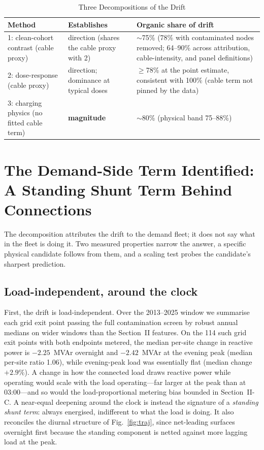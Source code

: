 \documentclass[journal]{IEEEtran}
\begin{document}
\begin{table}[!t]
\caption{Three Decompositions of the Drift}
\label{tab:triangulation}
\centering
\renewcommand{\arraystretch}{1.18}
\begin{tabular}{@{}p{}p{}p{}@{}}
\toprule
\textbf{Method} & \textbf{Establishes} & \textbf{Organic share of drift} \\
\midrule
1: clean-cohort contrast (cable proxy) & direction (shares the cable proxy with 2) & $\sim$75\% (78\% with contaminated nodes removed; 64--90\% across attribution, cable-intensity, and panel definitions) \\
2: dose-response (cable proxy) & direction; dominance at typical doses & $\geq$78\% at the point estimate, consistent with 100\% (cable term not pinned by the data) \\
3: charging physics (no fitted cable term) & \textbf{magnitude} & $\sim$80\% (physical band 75--88\%) \\
\bottomrule
\end{tabular}
\end{table}

\section{The Demand-Side Term Identified: A Standing Shunt Term Behind
Connections}
The decomposition attributes the drift to the demand fleet; it does not say what
in the fleet is doing it. Two measured properties narrow the answer, a specific
physical candidate follows from them, and a scaling test probes the candidate's
sharpest prediction.

\subsection{Load-independent, around the clock}
First, the drift is load-independent. Over the 2013--2025 window we summarise
each grid exit point passing the full contamination screen by robust annual
medians on wider windows than the Section~II features. On the 114 such grid exit
points with both endpoints metered, the median per-site change in reactive power
is $-2.25$~MVAr overnight and $-2.42$~MVAr at the evening peak (median per-site
ratio 1.06), while evening-peak load was essentially flat (median change
$+2.9\%$). A change in how the connected load draws reactive power while
operating would scale with the load operating---far larger at the peak than at
03:00---and so would the load-proportional metering bias bounded in
Section~II-C. A near-equal deepening around the clock is instead the signature of a
\emph{standing shunt term}: always energised, indifferent to what the load
is doing. It also reconciles the diurnal structure of Fig.~\ref{fig:traj}, since
net-leading surfaces overnight first because the standing component is netted
against more lagging load at the peak.
\end{document}
